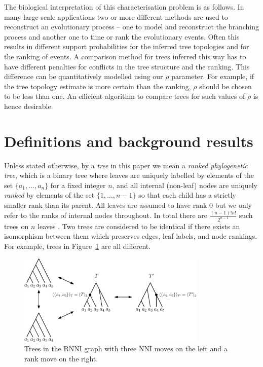 \documentclass[11pt]{amsart}
\newcommand{\rnni}{\mathrm{RNNI}}
\newcommand{\nni}{\mathrm{NNI}}
\begin{document}
The biological interpretation of this characterisation problem is as follows.
In many large-scale applications two or more different methods are used to reconstruct an evolutionary process -- one to model and reconstruct the branching process and another one to time or rank the evolutionary events.
Often this results in different support probabilities for the inferred tree topologies and for the ranking of events.
A comparison method for trees inferred this way has to have different penalties for conflicts in the tree structure and the ranking.
This difference can be quantitatively modelled using our $\rho$ parameter.
For example, if the tree topology estimate is more certain than the ranking, $\rho$ should be chosen to be less than one.
An efficient algorithm to compare trees for such values of $\rho$ is hence desirable.


\section{Definitions and background results}

Unless stated otherwise, by a \emph{tree} in this paper we mean a \emph{ranked phylogenetic tree}, which is a binary tree where leaves are uniquely labelled by elements of the set $\{a_1, \ldots, a_n\}$ for a fixed integer $n$, and all internal (non-leaf) nodes are uniquely \emph{ranked} by elements of the set $\{1, \ldots, n-1\}$ so that each child has a strictly smaller rank than its parent.
All leaves are assumed to have rank $0$ but we only refer to the ranks of internal nodes throughout.
In total there are $\frac{(n - 1)! n!}{2^{n-1}}$ such trees on $n$ leaves \autocite{Gavryushkin2018-ol}.
Two trees are considered to be identical if there exists an isomorphism between them which preserves edges, leaf labels, and node rankings.
For example, trees in Figure~\ref{fig:ranked_trees_ex} are all different.

\begin{figure}[ht]
\centering
\includegraphics[width=0.8\textwidth]{ranked_trees_ex}
\caption{Trees in the $\rnni$ graph with three $\nni$ moves on the left and a rank move on the right.}
\label{fig:ranked_trees_ex}
\end{figure}
\end{document}
